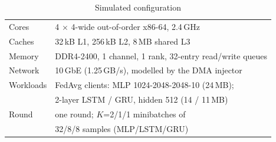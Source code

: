 \documentclass[conference]{IEEEtran}
\begin{document}
\begin{table}[t]
\centering
\caption{Simulated configuration}
\label{tab:config}
\footnotesize
\begin{tabular}{@{}ll@{}}
\toprule
Cores & 4 $\times$ 4-wide out-of-order x86-64, 2.4\,GHz \\
Caches & 32\,kB L1, 256\,kB L2, 8\,MB shared L3 \\
Memory & DDR4-2400, 1 channel, 1 rank, 32-entry read/write queues \\
Network & 10\,GbE (1.25\,GB/s), modelled by the DMA injector \\
Workloads & FedAvg clients: MLP 1024-2048-2048-10 (24\,MB); \\
 & 2-layer LSTM / GRU, hidden 512 (14 / 11\,MB) \\
Round & one round; $K$=2/1/1 minibatches of \\
 & 32/8/8 samples (MLP/LSTM/GRU) \\
\bottomrule
\end{tabular}
\end{table}
\end{document}
